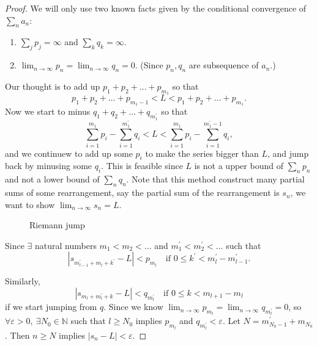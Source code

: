 \begin{proof}
    We will only use two known facts given by the conditional convergence of \(\sum_{n} a_n \): 
    \begin{enumerate}
        \item \(\sum_{j} p_j = \infty  \) and \(\sum_{k} q_k = \infty\). 
        \item \(\lim_{n \to \infty} p_n = \lim_{n \to \infty}q_n = 0 \). (Since \(p_n, q_n\) are subsequence of \(a_n\).)  
    \end{enumerate} 
    Our thought is to add up \(p_1 + p_2 + \dots + p_{m_1}\) so that 
    \[
        p_1 + p_2 + \dots + p_{m_1 - 1} < L < p_1 + p_2 + \dots + p_{m_1}.
    \] Now we start to minus \(q_1 + q_2 + \dots + q_{m_1^{\prime} }\) so that 
    \[
        \sum_{i=1}^{m_1} p_i - \sum_{i=1}^{m_1^{\prime}} q_i < L < \sum_{i=1}^{m_1} p_i - \sum_{i=1}^{m_1^{\prime} - 1} q_i,  
    \] and we continuew to add up some \(p_i\) to make the series bigger than \(L\), and jump back by minusing some \(q_i\). This is feasible since \(L\) is not a upper bound of \(\sum_{n} p_n \) and not a lower bound of \(\sum_{n} q_n \). Note that this method construct many partial sums of some rearrangement, say the partial sum of the rearrangement is \(s_n\), we want to show \(\lim_{n \to \infty} s_n = L \).

\begin{figure}[H]
    \centering
    \caption{Riemann jump}
    \label{fig:RiemannJump}
\end{figure}
    
    Since \(\exists\) natural numbers \(m_1 < m_2 < \dots \) and \(m_1^{\prime} < m_2^{\prime} < \dots  \) such that 
    \[
        \left\vert s_{m_{l-1}^{\prime} + m_l + k^{\prime} } - L \right\vert < p_{m_l} \quad \text{if } 0 \le k^{\prime}  < m_l^{\prime} - m_{l-1}^{\prime}. 
    \]

    Similarly,
    \[
        \left\vert s_{m_l + m_{l}^{\prime} + k} - L \right\vert < q_{m_l^{\prime} } \quad \text{if } 0 \le k < m_{l+1} - m_l 
    \] if we start jumping from \(q\). Since we know \(\lim_{n \to \infty} p_{m_l} = \lim_{n \to \infty} q_{m_l^{\prime} } = 0\), so \(\forall \varepsilon > 0, \ \exists N_0 \in \mathbb{N} \) such that \(l \ge N_0\) implies \(p_{m_l}\) and \(q_{m_l^{\prime} } < \varepsilon \). Let \(N = m_{N_0 - 1}^{\prime} + m_{N_0} \). Then \(n \ge N\) implies \(\left\vert s_n - L \right\vert < \varepsilon\).         
\end{proof}

